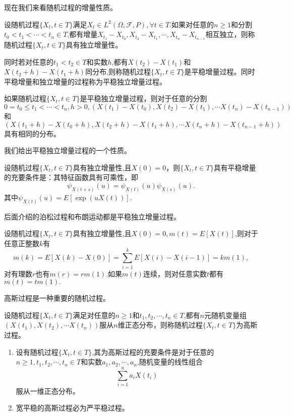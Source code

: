 \documentclass[lang=cn,10pt]{elegantbook}
\begin{document}
	现在我们来看随机过程的增量性质。
	\begin{definition}[独立增量和平稳增量]
		设随机过程\(\{X_t,t\in T\}\)满足\(X_t\in L^2(\Omega,\mathcal{F},P),\forall t\in T.\)如果对任意的\(n\ge 1\)和分割\(t_0<t_1<\cdots<t_n\in T\),都有增量\(X_{t_1}-X_{t_0},X_{t_2}-X_{t_1},\cdots,X_{t_n}-X_{t_{n-1}}\)相互独立，则称随机过程\(\{X_t,t\in T\}\)具有独立增量性。

		同时若对任意的\(t_1<t_2\in T\)和实数\(h\),都有\(X(t_2)-X(t_1)\)和\( X(t_2+h)-X(t_1+h)\)同分布,则称随机过程\(\{X_t,t\in T\}\)是平稳增量过程。同时平稳增量和独立增量的过程称为平稳独立增量过程。
	\end{definition}
	\begin{note}
		如果随机过程\(\{X_t,t\in T\}\)是平稳独立增量过程，则对于任意的分割\(0=t_0\le t_1<\cdots<t_n,h>0,(X(t_1)-X(t_0),X(t_2)-X(t_1),\cdots X(t_n)-X(t_{n-1}))\)和\((X(t_1+h)-X(t_0+h),X(t_2+h)-X(t_1+h),\cdots X(t_n+h)-X(t_{n-1}+h))\)具有相同的分布。
	\end{note}
	我们给出平稳独立增量过程的一个性质。
	\begin{proposition}
		设随机过程\(\{X_t,t\in T\}\)具有独立增量性,且\(X(0)=0\)，则\(\{X_t,t\in T\}\)具有平稳增量的充要条件是：其特征函数具有可乘性，即
		\[\psi_{X(t+s)}(u)=\psi_{X(t)}(u)\psi_{X(s)}(u).\]
		其中\(\psi_{X(t)}(u)=E[\exp{(uX(t))}].\)
	\end{proposition}
	后面介绍的泊松过程和布朗运动都是平稳独立增量过程。
	\begin{proposition}
		设随机过程\(\{X_t,t\in T\}\)具有独立增量性,且\(X(0)=0,m(t)=E[X(t)]\),则对于任意正整数\(k\)有
		\[m(k)=E[X(k)-X(0)]=\sum_{i=1}^{k}E[X(i)-X(i-1)]=km(1),\]
		对有理数\(r\)也有\(m(r)=rm(1)\).如果\(m(t)\)连续，则对任意实数\(t\)都有\(m(t)=tm(1).\)
	\end{proposition}
	高斯过程是一种重要的随机过程。
	\begin{definition}[高斯过程]
		设随机过程\(\{X_t,t\in T\}\)满足对任意的\(n\ge 1\)和\(t_1,t_2,\cdots,t_n\in T\),都有\(n\)元随机变量组\((X(t_1),X(t_2),\cdots X(t_n))\)服从\(n\)维正态分布，则称随机过程\(\{X_t,t\in T\}\)为高斯过程。
	\end{definition}
	\begin{property}
		\begin{enumerate}
			\item 设有随机过程\(\{X_t,t\in T\}\),其为高斯过程的充要条件是对于任意的\(n\ge1,t_1,t_2,\cdots,t_n\in T\)和实数\(a_1,a_2,\cdots,a_n\),随机变量的线性组合
		    \[\sum_{i=1}^{n}a_iX(t_i)\]
		    服从一维正态分布。
			\item 宽平稳的高斯过程必为严平稳过程。
		\end{enumerate}	
	\end{property}
\end{document}
